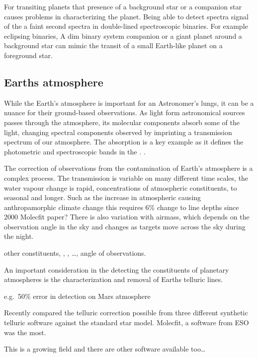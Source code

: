 For transiting planets that presence of a background star or a companion star causes problems in characterizing the planet. Being able to detect spectra signal of the a faint second spectra in double-lined spectroscopic binaries.
For example eclipsing binaries,
A dim binary system companion or a giant planet around a background star can mimic the transit of a small Earth-like planet on a foreground star.






\subsection{Earths atmosphere}
While the Earth's atmosphere is important for an Astronomer's lungs, it can be a nuance for their ground-based observations. As light form astronomical sources passes through the atmosphere, its molecular components absorb some of the light, changing spectral components observed by imprinting a transmission spectrum of our atmosphere. The  absorption is a key example as it defines the photometric and spectroscopic bands in the \nir{}. .

The correction of observations from the contamination of Earth's atmosphere is a complex process. The transmission is variable on many different time scales, the water vapour change is rapid, concentrations of atmospheric constituents, to seasonal and longer. Such as the increase in atmospheric  causing anthropamorphic climate change this requires 6\% change to  line depths since 2000 Molecfit paper? There is also variation with airmass, which depends on the observation angle in the sky and changes as targets move across the sky during the night.

other constituents, , ,  \ldots{}, angle of observations.

An important consideration in the detecting the constituents of planetary atmospheres is the characterization and removal of Earths telluric lines.

e.g.\ 50\% error in  detection on Mars atmosphere


Recently \citet{ulmer-moll_telluric_2018} compared the telluric correction possible from three different synthetic telluric software against the standard star model. Molecfit, a software from ESO was the most.

This is a growing field and there are other software available too\ldots{}



